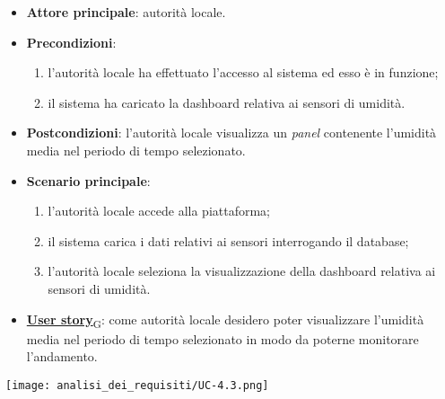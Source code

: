 \begin{itemize}
	\item \textbf{Attore principale}: autorità locale.
	\item \textbf{Precondizioni}:
	      \begin{enumerate}
		      \item l'autorità locale ha effettuato l'accesso al sistema ed esso è in funzione;
		      \item il sistema ha caricato la dashboard relativa ai sensori di umidità.
	      \end{enumerate}
	\item \textbf{Postcondizioni}: l'autorità locale visualizza un \textit{panel} contenente l'umidità media nel periodo di tempo selezionato.
	\item \textbf{Scenario principale}:
	      \begin{enumerate}
		      \item l'autorità locale accede alla piattaforma;
		      \item il sistema carica i dati relativi ai sensori interrogando il database;
		      \item l'autorità locale seleziona la visualizzazione della dashboard relativa ai sensori di umidità.
	      \end{enumerate}
	\item \href{https://7last.github.io/docs/rtb/documentazione-interna/glossario\#user-story}{\textbf{User story}\textsubscript{G}}: come autorità locale desidero poter visualizzare l'umidità media nel periodo di tempo selezionato
	      in modo da poterne monitorare l'andamento.
\end{itemize}
\begin{center}
	\texttt{[image: analisi\_dei\_requisiti/UC-4.3.png]}
\end{center}


